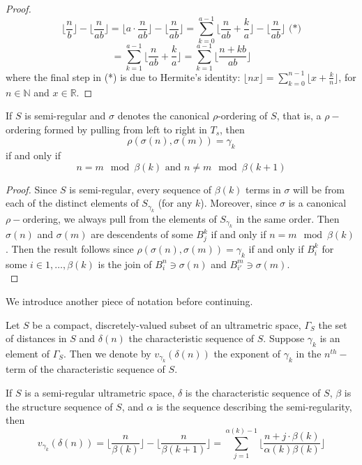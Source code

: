 \begin{proof}
\[\lfloor\frac{n}{b} \rfloor - \lfloor \frac{n}{ab} \rfloor = \lfloor a \cdot \frac{n}{ab} \rfloor - \lfloor \frac{n}{ab} \rfloor  = \sum_{k=0}^{a-1} \lfloor \frac{n}{ab} + \frac{k}{a} \rfloor - \lfloor \frac{n}{ab} \rfloor \text{ (*)}\]
\[= \sum_{k=1}^{a-1} \lfloor \frac{n}{ab} + \frac{k}{a} \rfloor = \sum_{k=1}^{a-1} \lfloor \frac{n + kb}{ab} \rfloor \]
where the final step in (*) is due to Hermite's identity: $\lfloor nx \rfloor = \sum_{k=0}^{n-1} \lfloor x + \frac{k}{n} \rfloor$, for $n \in \mathbb{N}$ and $x \in \mathbb{R}$.
\end{proof}                                                                                                              

\begin{lemma}
If $S$ is semi-regular and $\sigma$ denotes the canonical $\rho$-ordering of $S$, that is, a $\rho-$ordering formed by pulling from left to right in $T_s$, then \[\rho(\sigma(n),\sigma(m))=\gamma_k\] if and only if \[ n=m \mod \beta(k) \text{  and } n \neq m \mod \beta(k+1)\]
\end{lemma}

\begin{proof}
Since $S$ is semi-regular, every sequence of $\beta(k)$ terms in $\sigma$ will be from each of the distinct elements of $S_{\gamma_k}$ (for any $k$). Moreover, since $\sigma$ is a canonical $\rho-$ordering, we always pull from the elements of $S_{\gamma_k}$ in the same order. Then $\sigma(n)$ and $\sigma(m)$ are descendents of some $B^k_j$ if and only if $n = m \mod \beta(k)$. Then the result follows since $\rho(\sigma(n),\sigma(m))=\gamma_k$ if and only if $B^k_i$ for some $i \in 1,\ldots, \beta(k)$ is the join of $B^n_i \ni \sigma(n)$ and $B^m_{i'} \ni \sigma(m)$.  \\ 
\end{proof}

We introduce another piece of notation before continuing.

\begin{notation}
	Let $S$ be a compact, discretely-valued subset of an ultrametric space, $\Gamma_S$ the set of distances in $S$ and $\delta(n)$ the characteristic sequence of $S$. Suppose $\gamma_k$ is an element of $\Gamma_S$. Then we denote by $v_{\gamma_k}(\delta(n))$ the exponent of $\gamma_k$ in the $n^{th}-$term of the characteristic sequence of $S$.
\end{notation}

\begin{proposition}
If $S$ is a semi-regular ultrametric space, $\delta$ is the characteristic sequence of $S$, $\beta$ is the structure sequence of $S$, and $\alpha$ is the sequence describing the semi-regularity, then
\[v_{\gamma_k}(\delta(n)) =  \lfloor\frac{n}{\beta(k)}\rfloor - \lfloor\frac{n}{\beta(k+1)}\rfloor = \sum_{j=1}^{\alpha(k)-1} \lfloor \frac{n + j\cdot \beta(k)}{\alpha(k)\beta(k)} \rfloor\]
\end{proposition}

